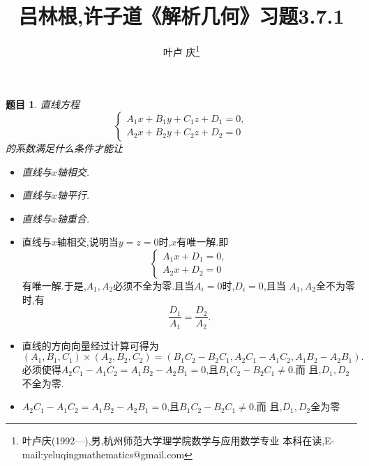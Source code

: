 \documentclass[a4paper]{article}
\newtheorem*{exe}{题目}
\newenvironment{exercise}
{\bigskip\begin{mdframed}\begin{exe}}
    {\end{exe}\end{mdframed}\bigskip}
\begin{document}
\title{\huge{\bf{吕林根,许子道《解析几何》习题3.7.1}}} \author{\small{叶卢
    庆\footnote{叶卢庆(1992---),男,杭州师范大学理学院数学与应用数学专业
      本科在读,E-mail:yeluqingmathematics@gmail.com}}}
\maketitle
\begin{exercise}
直线方程
$$
\begin{cases}
  A_1x+B_1y+C_1z+D_1=0,\\
A_2x+B_2y+C_2z+D_2=0
\end{cases}
$$
的系数满足什么条件才能让
\begin{itemize}
\item 直线与$x$轴相交.
\item 直线与$x$轴平行.
\item 直线与$x$轴重合.
\end{itemize}
\end{exercise}
\begin{itemize}
\item 直线与$x$轴相交,说明当$y=z=0$时,$x$有唯一解.即
$$
\begin{cases}
  A_1x+D_1=0,\\
A_2x+D_2=0
\end{cases}
$$
有唯一解.于是,$A_1,A_2$必须不全为零.且当$A_i=0$时,$D_i=0$,且当
$A_1,A_2$全不为零时,有
$$
\frac{D_1}{A_1}=\frac{D_2}{A_2}.
$$
\item 直线的方向向量经过计算可得为
$$
(A_1,B_1,C_1)\times (A_2,B_2,C_2)=(B_1C_2-B_2C_1,A_2C_1-A_1C_2,A_1B_2-A_2B_1).
$$
必须使得$A_2C_1-A_1C_2=A_1B_2-A_2B_1=0$,且$B_1C_2-B_2C_1\neq 0$.而
且,$D_1,D_2$不全为零.
\item $A_2C_1-A_1C_2=A_1B_2-A_2B_1=0$,且$B_1C_2-B_2C_1\neq 0$.而
且,$D_1,D_2$全为零
\end{itemize}
\end{document}
